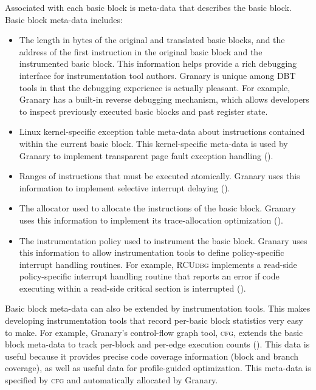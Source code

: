 \documentclass[preprint]{sigplanconf}
\newcommand{\toolname}[1]{{\scshape #1}}
\begin{document}
Associated with each basic block is meta-data that describes the basic block. Basic block meta-data includes: \begin{itemize}
	\item The length in bytes of the original and translated basic blocks, and the address of the first instruction in the original basic block and the instrumented basic block. This information helps provide a rich debugging interface for instrumentation tool authors. Granary is unique among DBT tools in that the debugging experience is actually pleasant. For example, Granary has a built-in reverse debugging mechanism, which allows developers to inspect previously executed basic blocks and past register state.
	\item Linux kernel-specific exception table meta-data about instructions contained within the current basic block. This kernel-specific meta-data is used by Granary to implement transparent page fault exception handling ().
	\item Ranges of instructions that must be executed atomically. Granary uses this information to implement selective interrupt delaying ().
	\item The allocator used to allocate the instructions of the basic block. Granary uses this information to implement its trace-allocation optimization ().
	\item The instrumentation policy used to instrument the basic block. Granary uses this information to allow instrumentation tools to define policy-specific interrupt handling routines. For example, \toolname{RCUdbg} implements a read-side policy-specific interrupt handling routine that reports an error if code executing within a read-side critical section is interrupted ().
\end{itemize}

Basic block meta-data can also be extended by instrumentation tools. This makes developing instrumentation tools that record per-basic block statistics very easy to make. For example, Granary's control-flow graph tool, \toolname{cfg}, extends the basic block meta-data to track per-block and per-edge execution counts (). This data is useful because it provides precise code coverage information (block and branch coverage), as well as useful data for profile-guided optimization. This meta-data is specified by \toolname{cfg} and automatically allocated by Granary. 
\end{document}
